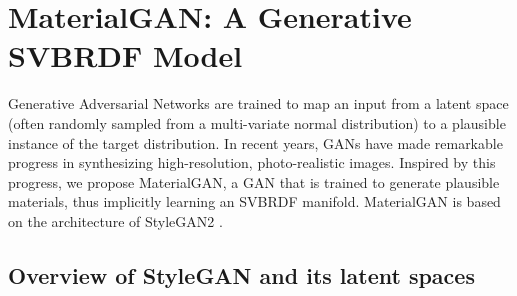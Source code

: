\section{MaterialGAN: A Generative SVBRDF Model}
\label{sec:svbrdf:gan}

Generative Adversarial Networks \cite{goodfellow2014generative} are trained to map an input from a latent space (often randomly sampled from a multi-variate normal distribution) to a plausible instance of the target distribution.
In recent years, GANs have made remarkable progress in synthesizing high-resolution, photo-realistic images. Inspired by this progress, we propose MaterialGAN, a GAN that is trained to generate plausible materials, thus implicitly learning an SVBRDF manifold. MaterialGAN is based on the architecture of StyleGAN2 \cite{karras2020analyzing}.


\subsection{Overview of StyleGAN and its latent spaces}
\label{ssec:latent_space}

